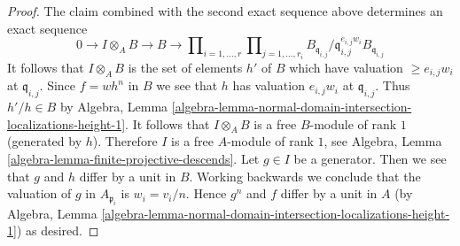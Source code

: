 \documentclass[10pt,a4paper]{amsart}
\theoremstyle{plain}
\theoremstyle{definition}
\theoremstyle{remark}
\numberwithin{equation}{subsection}
\begin{document}
\begin{proof}
\medskip\noindent
The claim combined with the second exact sequence above
determines an exact sequence
$$
0 \to I \otimes_A B \to B \to
\prod\nolimits_{i = 1, \ldots, r}
\prod\nolimits_{j = 1, \ldots, r_i}
B_{\mathfrak q_{i, j}}/\mathfrak q_{i, j}^{e_{i, j}w_i}B_{\mathfrak q_{i, j}}
$$
It follows that $I \otimes_A B$ is the set of elements $h'$ of $B$
which have valuation $\geq e_{i, j}w_i$ at $\mathfrak q_{i, j}$.
Since $f = wh^n$ in $B$ we see that $h$ has valuation
$e_{i, j}w_i$ at $\mathfrak q_{i, j}$. Thus $h'/h \in B$
by Algebra, Lemma
\ref{algebra-lemma-normal-domain-intersection-localizations-height-1}.
It follows that $I \otimes_A B$ is a free $B$-module of rank $1$
(generated by $h$).
Therefore $I$ is a free $A$-module of rank $1$, see
Algebra, Lemma \ref{algebra-lemma-finite-projective-descends}.
Let $g \in I$ be a generator. Then we see that
$g$ and $h$ differ by a unit in $B$. Working backwards we
conclude that the valuation of $g$ in $A_{\mathfrak p_i}$ is
$w_i = v_i/n$. Hence $g^n$ and $f$ differ by a unit in $A$
(by Algebra, Lemma
\ref{algebra-lemma-normal-domain-intersection-localizations-height-1})
as desired.
\end{proof}
\end{document}
